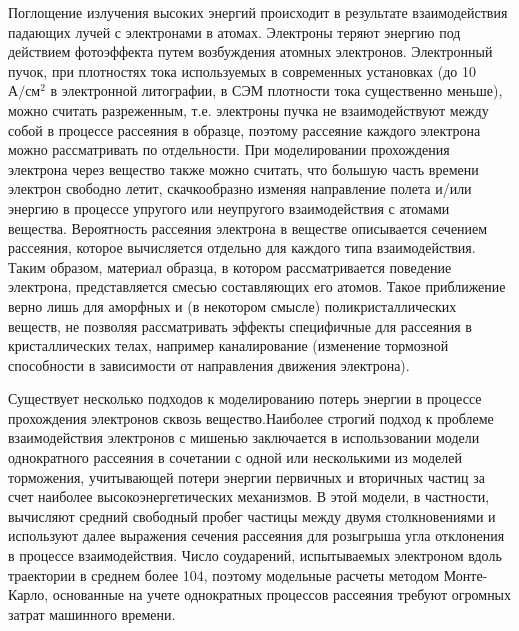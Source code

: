 Поглощение излучения высоких энергий происходит в результате взаимодействия падающих лучей с электронами в атомах. Электроны теряют энергию под действием фотоэффекта путем возбуждения атомных электронов.
Электронный пучок, при плотностях тока используемых в современных установках (до 10 $\text{А}/\text{см}^2$ в электронной литографии, в СЭМ плотности тока существенно меньше), можно считать разреженным, т.е. электроны пучка не взаимодействуют между собой в процессе рассеяния в образце, поэтому рассеяние каждого электрона можно рассматривать по отдельности.
При моделировании прохождения электрона через вещество также можно считать, что большую часть времени электрон свободно летит, скачкообразно изменяя направление полета и/или энергию в процессе упругого или неупругого взаимодействия с атомами вещества. Вероятность рассеяния электрона в веществе описывается сечением рассеяния, которое вычисляется отдельно для каждого типа взаимодействия.
Таким образом, материал образца, в котором рассматривается поведение электрона, представляется смесью составляющих его атомов. Такое приближение верно лишь для аморфных и (в некотором смысле) поликристаллических веществ, не позволяя рассматривать эффекты специфичные для рассеяния в кристаллических телах, например каналирование (изменение тормозной способности в зависимости от направления движения электрона).

Существует несколько подходов к моделированию потерь энергии в процессе прохождения электронов сквозь вещество.Наиболее строгий подход к проблеме взаимодействия электронов с мишенью заключается в использовании модели однократного рассеяния	в сочетании с одной или несколькими из моделей торможения, учитывающей потери энергии первичных и вторичных частиц за счет наиболее высокоэнергетических механизмов.
В этой модели, в частности, вычисляют средний свободный пробег частицы между двумя столкновениями и используют далее выражения сечения рассеяния для розыгрыша угла отклонения в процессе взаимодействия. Число соударений, испытываемых электроном вдоль траектории в среднем более 104, поэтому модельные расчеты методом Монте-Карло, основанные на учете однократных процессов рассеяния требуют огромных затрат машинного времени.

